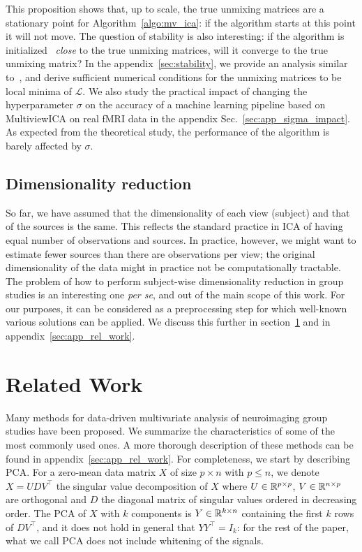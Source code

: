 This proposition shows that, up to scale, the true unmixing matrices are a stationary point for Algorithm~\ref{algo:mv_ica}: if the algorithm starts at this point it will not move.
%
The question of stability is also interesting: if the algorithm is initialized ~\emph{close} to the true unmixing matrices, will it converge to the true unmixing matrix?
%
In the appendix~\ref{sec:stability}, we provide an analysis similar to~\cite{cardoso1998blind}, and derive sufficient numerical conditions for the unmixing matrices to be local minima of $\mathcal{L}$.
%
We also study the practical impact of changing the hyperparameter $\sigma$ on the accuracy of a machine learning pipeline based on MultiviewICA on real fMRI data in the appendix Sec.~\ref{sec:app_sigma_impact}.
%
As expected from the theoretical study, the performance of the algorithm is barely affected by $\sigma$.
\subsection{Dimensionality reduction}
%
So far, we have assumed that the dimensionality of each view (subject) and that of the sources is the same. This reflects the standard practice in ICA of having equal number of observations and sources. 
%
In practice, however, we might want to estimate fewer sources than there are observations per view; the original dimensionality of the data %
might in practice not be computationally tractable.
%
The problem of how to perform subject-wise dimensionality reduction in group studies 
is an interesting one \emph{per se}, and out of the main scope of this work. For our purposes, it can be considered as a preprocessing step for which well-known various solutions can be applied. %
We discuss this further in section~\ref{sec:rel_work} and in appendix~\ref{sec:app_rel_work}.
%
%
%
\section{Related Work}
\label{sec:rel_work}
Many methods for data-driven multivariate analysis of neuroimaging group studies have been proposed. We summarize the characteristics of some of the most commonly used ones. A more thorough description of these methods can be found in appendix~\ref{sec:app_rel_work}.
%
For completeness, we start by describing PCA. For a zero-mean data matrix $X$ of size $p\times n$ with $p \leq n$, we denote $X= UD V^{\top}$ the singular value decomposition of $X$ where $U \in \mathbb{R}^{p\times p}$, $V \in \mathbb{R}^{n \times p}$ are orthogonal and $D$ the diagonal matrix of singular values ordered in decreasing order.
%
The PCA of $X$ with $k$ components is $Y\in\mathbb{R}^{k\times n}$ containing the first $k$ rows of $DV^{\top}$, and it does not hold in general that $YY^{\top}=I_k$: for the rest of the paper, what we call PCA does not include whitening of the signals.


